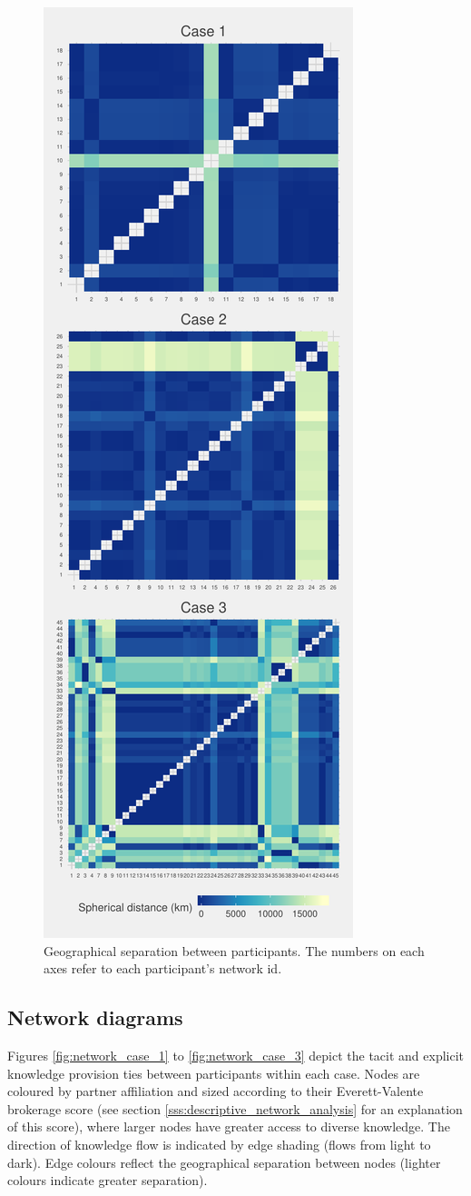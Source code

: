 \begin{figure}[h!]
\centering
\includegraphics[width = 0.5\linewidth]{Images/proximity.pdf}
\caption[Geographical separation between participants]{Geographical separation between participants. The numbers on each axes refer to each participant's network id.}
\label{fig:spherical}
\end{figure}

\subsection{Network diagrams}

Figures \ref{fig:network_case_1} to \ref{fig:network_case_3} depict the tacit and explicit knowledge provision ties between participants within each case. Nodes are coloured by partner affiliation and sized according to their Everett-Valente brokerage score (see section \ref{sss:descriptive_network_analysis} for an explanation of this score), where larger nodes have greater access to diverse knowledge. The direction of knowledge flow is indicated by edge shading (flows from light to dark). Edge colours reflect the geographical separation between nodes (lighter colours indicate greater separation). \medskip

